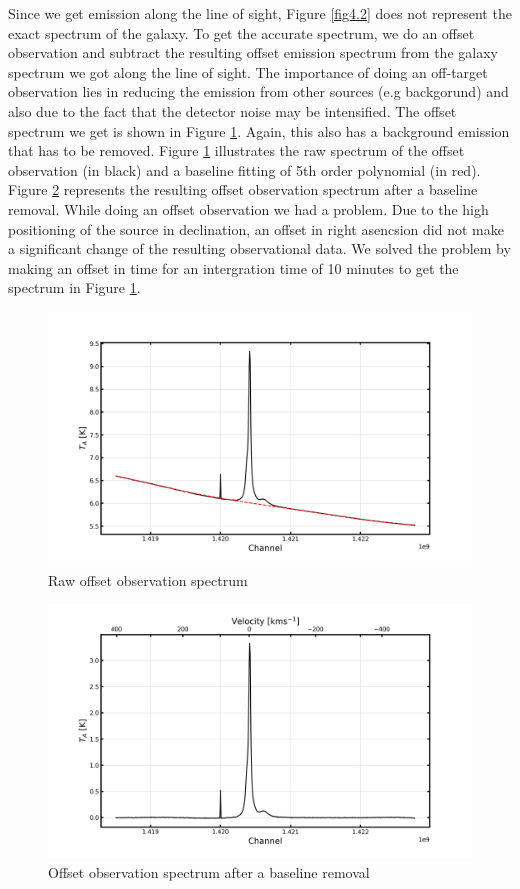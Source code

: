 \documentclass[12pt]{article}
\begin{document}
Since we get emission along the line of sight, Figure \ref{fig4.2}
does not represent the exact spectrum of the galaxy. To get the accurate spectrum, we do an offset observation and subtract the resulting offset emission spectrum from the galaxy spectrum we got along the line of sight. The importance of doing an off-target observation lies in reducing the emission from other sources (e.g backgorund) and also due to the fact that the detector noise may be intensified. 
The offset spectrum we get is shown in Figure \ref{fig4.3}.
Again, this also has a background emission that has to be removed. Figure \ref{fig4.3} illustrates the raw spectrum of the offset observation (in black) and a baseline fitting of 5th order polynomial (in red). Figure \ref{fig4.4} represents the resulting offset observation spectrum after a baseline removal. While doing an offset observation we had a problem. Due to the high positioning of the source in declination, an offset in right asencsion did not make a significant change of the resulting observational data. We solved the problem by making an offset in time for an intergration time of 10 minutes to get the spectrum in Figure \ref{fig4.3}. 

\begin{figure}[H]
    \centering
    \includegraphics[width = \textwidth]{fig/offset.png}
    \caption{Raw offset observation spectrum}
    \label{fig4.3}
\end{figure}

\begin{figure}[H]
    \centering
    \includegraphics[width = \textwidth]{fig/offset_baseline_removal.png}
    \caption{Offset observation spectrum after a baseline removal}
    \label{fig4.4}
\end{figure}
\end{document}
